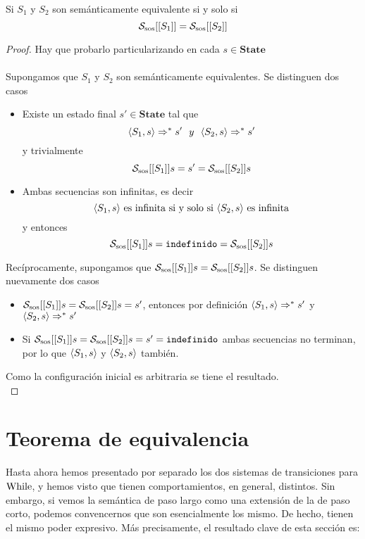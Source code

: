 \begin{prop} Si $S_1$ y $S_2$ son semánticamente equivalente si y solo si
\[
        \mathcal{S}_{\mathrm{sos}}[[S_1]] = \mathcal{S}_{\mathrm{sos}}[[S_2]]
\] 
\begin{proof} Hay que probarlo particularizando en cada $s\in\textbf{State}$ \\ \\
Supongamos que $S_1$ y $S_2$ son semánticamente equivalentes. Se distinguen dos casos
\begin{itemize}
    \item Existe un estado final $s'\in\textbf{State}$ tal que
    \[
        \la{S_1}{s}\dto^* s'\ \ y\ \ \la{S_2}{s} \dto^* s'
    \]
    y trivialmente
    \[
        \mathcal{S}_{\mathrm{sos}}[[S_1]]s = s' =  \mathcal{S}_{\mathrm{sos}}[[S_2]]s
    \]
    \item Ambas secuencias son infinitas, es decir
    \[
        \langle S_1, s \rangle\text{ es infinita si y solo si } \langle S_2, s \rangle \text{ es infinita}
    \]
    y entonces
    \[
        \mathcal{S}_{\mathrm{sos}}[[S_1]]s = \texttt{indefinido} =  \mathcal{S}_{\mathrm{sos}}[[S_2]]s
    \]
\end{itemize} 
Recíprocamente, supongamos que $ \mathcal{S}_{\mathrm{sos}}[[S_1]]s =  \mathcal{S}_{\mathrm{sos}}[[S_2]]s$. Se distinguen nuevamente dos casos 
\begin{itemize}
    \item $\mathcal{S}_{\mathrm{sos}}[[S_1]]s =  \mathcal{S}_{\mathrm{sos}}[[S_2]]s = s'$, entonces por definición $ \langle S_1, s \rangle\Rightarrow^* s'$ y $\langle S_2, s \rangle\Rightarrow^* s'$
    \item Si $\mathcal{S}_{\mathrm{sos}}[[S_1]]s =  \mathcal{S}_{\mathrm{sos}}[[S_2]]s = s' = \texttt{indefinido}$ ambas secuencias no terminan, por lo que $\langle S_1, s \rangle$ y $\langle S_2, s \rangle$ también.  \\
\end{itemize} 
Como la configuración inicial es arbitraria se tiene el resultado. \\
\end{proof}
\end{prop}

\section{Teorema de equivalencia}

Hasta ahora hemos presentado por separado los dos sistemas de transiciones para $\mathrm{While}$, y hemos visto que tienen comportamientos, en general, distintos. Sin embargo, si vemos la semántica de paso largo como una extensión de la de paso corto, podemos convencernos que son esencialmente los mismo. De hecho, tienen el mismo poder expresivo. Más precisamente, el resultado clave de esta sección es:

